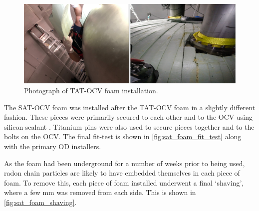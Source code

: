 \begin{figure}[]
\includegraphics[width=\linewidth]{Figures/Construction/TAT_foam_installation_merged_images.png}
\caption{Photograph of TAT-OCV foam installation.}
\label{fig:TAT_foam_installation}
\end{figure}

\par
The SAT-OCV foam was installed after the TAT-OCV foam in a slightly different fashion.
These pieces were primarily secured to each other and to the OCV using silicon sealant \cite{dowsil_silicone_ref}.
Titanium pins were also used to secure pieces together and to the bolts on the OCV.
The final fit-test is shown in \autoref{fig:sat_foam_fit_test} along with the primary OD installers.

\par
As the foam had been underground for a number of weeks prior to being used, radon chain particles are likely to have embedded themselves in each piece of foam.
To remove this, each piece of foam installed underwent a final `shaving', where a few mm was removed from each side.
This is shown in \autoref{fig:sat_foam_shaving}.


